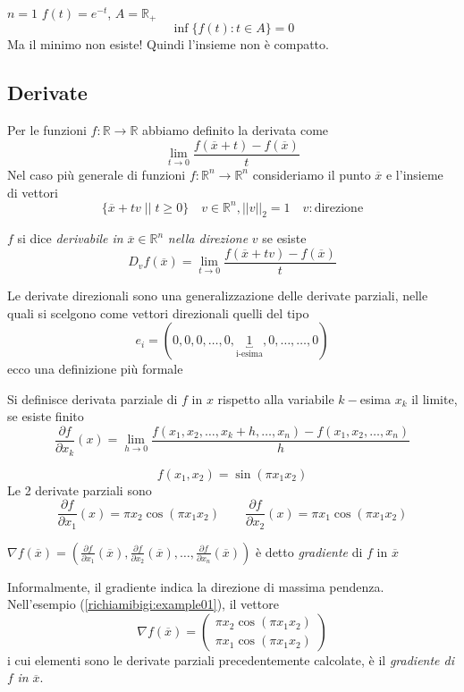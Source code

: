 \begin{example}
 $n = 1$  $f(t) = e^{-t}$, $A = \mathbb{R}_{+}$
 $$\inf \{ f(t): t \in A \} = 0$$ 
Ma il minimo non esiste! Quindi l'insieme non è compatto.
\end{example}

\subsection{Derivate}
Per le funzioni $f:\mathbb{R} \rightarrow \mathbb{R}$ abbiamo definito
la derivata come
$$ \lim_{t \to 0 } \frac{f(\overline{x} + t) - f(\overline{x})}{t}$$
Nel caso pi\`u generale di funzioni $f:\mathbb{R}^n \rightarrow \mathbb{R}^n$
consideriamo il punto $\overline{x}$ e l'insieme di vettori 
$$ \{ \overline{x} + tv \; | | \; t \geq 0  \} \quad  v \in \mathbb{R}^n, || v||_{2} = 1 \quad v:\text{direzione} $$

\begin{defn}
$f$ si dice \emph{derivabile in} $\overline{x} \in \mathbb{R}^{n}$ 
\emph{nella direzione} $v$ se esiste
$$D_v f(\overline{x}) = \lim_{t \to 0 } \frac{f(\overline{x} + tv) - f(\overline{x})}{t}$$
\end{defn}

Le derivate direzionali sono una generalizzazione delle derivate
parziali, nelle quali si scelgono come vettori direzionali quelli
del tipo
$$ e_i = (0,0,0,\ldots, 0,\underbracket{1}_{\text{i-esima}},0, \ldots, \ldots, 0) $$
ecco una definizione più formale
\begin{defn}
Si definisce derivata parziale di $f$ in $x$ rispetto alla variabile
$k-$esima $x_k$ il limite, se esiste finito
$$\frac{\partial f}{\partial x_k} (x)=\lim_{h\to 0}\frac{f(x_1,x_2,\ldots,x_k+h,\ldots,x_n)-f(x_1,x_2,\ldots,x_n)}{h}$$
\end{defn}

\begin{example}
\label{richiamibigi:example01}
$$f(x_1,x_2) = \sin(\pi x_1 x_2)  $$
Le 2 derivate parziali sono
$$
\frac{\partial f}{\partial x_1}(x) = \pi x_2 \cos(\pi x_1 x_2)
\qquad
\frac{\partial f}{\partial x_2}(x) = \pi x_1 \cos(\pi x_1 x_2)
$$
\end{example}

\begin{defn}[Gradiente]
$\nabla f(\overline{x}) = 
(\frac{\partial f}{\partial x_1}(\overline{x}),
\frac{\partial f}{\partial x_2}(\overline{x}),
\ldots,
\frac{\partial f}{\partial x_n}(\overline{x}))$
\`e detto \emph{gradiente} di $f$ in $\overline{x}$
\end{defn}
Informalmente, il gradiente indica la direzione di massima pendenza.\\
Nell'esempio (\ref{richiamibigi:example01}),  il vettore
$$ \nabla f(\overline{x}) = 
\begin{pmatrix}
  \pi x_2 \cos(\pi x_1 x_2) \\
\pi x_1 \cos(\pi x_1 x_2)
\end{pmatrix}
$$
i cui elementi sono le derivate parziali precedentemente calcolate,
è il \emph{gradiente di} $f$ \emph{in} $\overline{x}$.\\

